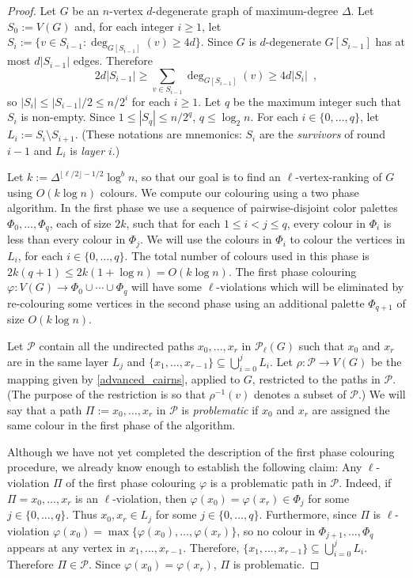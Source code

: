\documentclass{patmorin}
\newcommand{\defin}[1]{\emph{\color{brightmaroon}#1}}
\begin{document}
\begin{proof}
  Let $G$ be an $n$-vertex $d$-degenerate graph of maximum-degree $\Delta$.  Let $S_0:=V(G)$ and, for each integer $i\ge 1$, let $S_i:=\{v\in S_{i-1}:\deg_{G[S_{i-1}]}(v)\ge 4d\}$.  Since $G$ is $d$-degenerate $G[S_{i-1}]$ has at most $d|S_{i-1}|$ edges.  Therefore
  \[
    2d|S_{i-1}|\ge \sum_{v\in S_{i-1}} \deg_{G[S_{i-1}]}(v)\ge 4d|S_i| \enspace ,
  \]
  so $|S_i|\le |S_{i-1}|/2\le n/2^i$ for each $i\ge 1$.  Let $q$ be the maximum integer such that $S_i$ is non-empty.  Since $1\le |S_q|\le n/2^q$, $q\le \log_2 n$.  For each $i\in\{0,\ldots,q\}$, let $L_i:=S_i\setminus S_{i+1}$.  (These notations are mnemonics: $S_i$ are the \defin{survivors} of round $i-1$ and $L_i$ is \defin{layer} $i$.)

  Let $k:=\Delta^{\lfloor\ell/2\rfloor-1/2}\log^b n$, so that our goal is to find an $\ell$-vertex-ranking of $G$ using $O(k\log n)$ colours. We compute our colouring using a two phase algorithm. In the first phase we use a sequence of pairwise-disjoint color palettes $\Phi_0,\ldots,\Phi_{q}$, each of size $2k$, such that for each $1\le i < j\le q$, every colour in $\Phi_i$ is less than every colour in $\Phi_j$.  We will use the colours in $\Phi_i$ to colour the vertices in $L_i$, for each $i\in\{0,\ldots,q\}$.  The total number of colours used in this phase is $2k(q+1)\le 2k(1+\log n)= O(k\log n)$.  The first phase colouring $\varphi:V(G)\to\Phi_0\cup\cdots\cup\Phi_q$ will have some $\ell$-violations which will be eliminated by re-colouring some vertices in the second phase using an additional palette $\Phi_{q+1}$ of size $O(k\log n)$.

  Let $\mathcal{P}$ contain all the undirected paths $x_0,\ldots,x_r$ in $\mathcal{P}_{\ell}(G)$ such that $x_0$ and $x_r$ are in the same layer $L_j$ and $\{x_1,\ldots,x_{r-1}\}\subseteq \bigcup_{i=0}^j L_i$.  Let $\rho:\mathcal{P}\to V(G)$ be the mapping given by \cref{advanced_cairns}, applied to $G$, restricted to the paths in $\mathcal{P}$. (The purpose of the restriction is so that $\rho^{-1}(v)$ denotes a subset of $\mathcal{P}$.)  We will say that a path $\Pi:=x_0,\ldots,x_r$ in $\mathcal{P}$ is \defin{problematic} if $x_0$ and $x_r$ are assigned the same colour in the first phase of the algorithm.

  Although we have not yet completed the description of the first phase colouring procedure, we already know enough to establish the following claim:  Any $\ell$-violation $\Pi$ of the first phase colouring $\varphi$ is a problematic path in $\mathcal{P}$.  Indeed, if $\Pi=x_0,\ldots,x_r$ is an $\ell$-violation, then $\varphi(x_0)=\varphi(x_r)\in \Phi_j$ for some $j\in\{0,\ldots,q\}$.  Thus $x_0,x_r\in L_j$ for some $j\in\{0,\ldots,q\}$.  Furthermore, since $\Pi$ is $\ell$-violation $\varphi(x_0)=\max\{\varphi(x_0),\ldots,\varphi(x_r)\}$, so no colour in $\Phi_{j+1},\ldots,\Phi_q$ appears at any vertex in $x_1,\ldots,x_{r-1}$.  Therefore, $\{x_1,\ldots,x_{r-1}\}\subseteq \bigcup_{i=0}^j L_i$.  Therefore $\Pi\in\mathcal{P}$.  Since $\varphi(x_0)=\varphi(x_r)$, $\Pi$ is problematic.


\end{proof}
\end{document}

